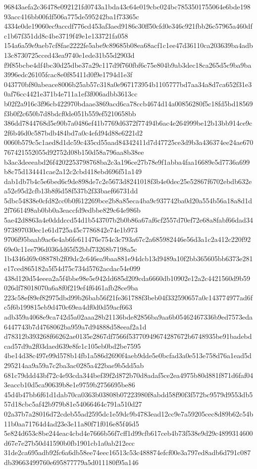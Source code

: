 \documentclass[11pt,a4paper]{article}
\begin{document}
{96843aefa2c36478e092121fd0743a1bda43c64e019cbc024bc7853501755064e6bde19893acc416bb00fdf506a775de595242ba1f73365c
4334e0de19060ec9accdf776cd453af3aed9186c30ff50cfd0e346c921fbb26c57965a460dfc1b67f351dd8c4be3719f49e1e133721fa058
154a6a59e9aeb7cf8fae2222fe5abe9c89685b08ea68acf1c1ee47d36110ca203639ba4adb13c8730725cced43ea9740e1ede31b55d2903d
f9f85bcbe4df4bc30d25dbe37a29c117d9f760fbf6c75e804b9ab3dec18ca265d5c9ba9ba3996edc26105fcac8e0f85411d0f9e1794d1e3f
043770bf80abeace8006b25ab57c318a0e967173954b1105777bd7aa34a8d7ca652f31e30af76cc4421e371b4e711a1ef3f006adbb3613cc
b02f2a916c3f96cb422970bdaae3869acd6ca78ccb4674d14a00856280f5c18fd5bd18569f3b0f2c650b7d8bdcf0de051b559ef5210658bb
386dd7844768d5e90b7a0486ef41b7769d6372f77494b6ac4e264999be12b13bb914ce9c2f6b46d0c587bdb484bd7a0c4efd94d88e6221d2
0060b579c5c1aed8d1dc59c435cd55aad84342411d7d47725ce3d9b3a436374ee24ae670767421552055d92752d08b150d58a796aa8b38ee
b3ac3deeeabd26f4202253798768ba2c3a196ce27b78e9f1abba4faa16689e5d7736a699b8c75d134441cae2a12c2cbd418ebd696f51a149
dab1db7b4c5e6bed6c9de898de7c2e5673d8241018f3b4e0dec25e52867f6702ebdb632ea52e95d2cfb13b8f6d58f537b2f33baef66731dd
5dbc54838e0cfd82cc0b0f612269bce2b8a85eca4ba9c937742ba0d20a554b56a18a8d1d2f7661498ab0bb0a3eaccfd9edbbe829c64e986b
5ae42d8863a4e0dddccd54d1b543707b2b0b86a67af6cf2557d70ef72e68a8fabf66dad34973897030ec1e61d725a45c7786842e74e1b973
9706f95baab9ac6e4ab6fe611476e754c3c793a67c2a685982446e56d3a1c2a412c220f9269e0c11ee796d036dd65f52bbf73268b7198a5c
1b4346d69c08878b2f09dc2c646ea9baa881e94dcb13d9489a10f2bb365605bb6373e281e17ced865182a5f54d75c734d5762acdac54e099
438d120d54eeea2a5f4bbe98e5e942dd685d209cda6660db10902e12a2c4421560d9b59026df78018070a6a8f0f219ef4f6461afb28ce9ba
223c58ef89ef82975dbd99b26bab56f21fe361788f3beb04f332590657a0c143774977ad6fc5f6b199815eb9d470c69ea4df0d0d59acf663
adb359a4068e9ca742d5a02aaa28b21136bde82856ba9aa6b05462467336b9ed7573eda6447743b7d4768062ba959a7d94888d58eeaf2a1d
d78312b393268f66262ae0135e2867df7566f53770949674287672b6748935be91badebdcad57d9a2f03daed639e8fe1c105eb0bd2be7595
4be14d38c497e99d578b14fb1a586d2690f4aeb9dde5e0bcfad3a0e513e758d76a1ead5d295214aa9a59a7c2ba3ac0285a422bae9b5dd5ab
681c79ddd43bf72c4e93cda344bef39f2d872b70d8adaf5ce2ea4975b80d881f871d6faf043eaccb10d5ca90639b8e1e9759b2756695be86
45d4b47bb6f61d1dab70ca0363b03808b07223980f8abdd58f90f3f572bc9579d9553db557d18cbc5af42b979b81e54066464c791a510d27
02a37b7a28016d72cdeb55ad2595dc1e59dc9b4783ead12cc9e7a59205cec8d89b62c54b11b0aa71764d4ad23e3e11a80f71f016e85f46d5
5e824d653c8be244eac4cbd4e7666b56f7cff1d99cfb617ceb4b73f538e9d29c4899314600d67e7e27b50d41590b0fb1901cb1a0ab212ecc
31de2ca695adb92fc6a6db58ee74eec16513c53c488874efcf00e3a797ed8adb6d791c087db39663499760e695877779a5d011180f95a146
}
\end{document}
